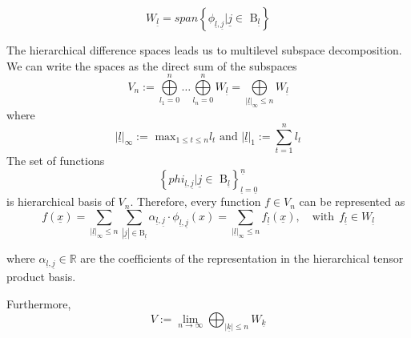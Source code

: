 \begin{equation}
     W_{\underline{l}} = span\left\{\phi_{\underline{l},\underline{j}} | \underline{j} \in \text{ B}_{\underline{l}}\right\}
\end{equation}

The hierarchical difference spaces leads us to multilevel subspace decomposition. We can write the spaces as the direct sum of the subspaces
\begin{equation}
     V_{n} := \bigoplus\limits_{l_{1} = 0}^n \dots \bigoplus\limits_{l_{n} = 0}^n W_{\underline{l}} = \bigoplus\limits_{\left|\underline{l} \right|_{\infty} \leq n} W_{\underline{l}}
     \label{eq9}
\end{equation}
where
\begin{equation}
     \left|\underline{l} \right|_{\infty} := \text{ max}_{1 \leq t \leq n} l_{t} \text{ and } \left|\underline{l} \right|_{1} := \sum\limits_{t=1}^{n} l_{t}
\end{equation}
The set of functions
\begin{equation}
     \left\{phi_{\underline{l},\underline{j}} | \underline{j} \in \text{ B}_{\underline{l}} \right\}_{\underline{l} = \underline{0}}^{\underline{n}}
\end{equation}
is hierarchical basis of $V_{n}$. Therefore, every function $f \in V_{n}$ can be represented as
\begin{equation}
	f(\underline{x}) = \sum_{|\underline{l}|_\infty\le n} \sum_{|\underline{j}| \in \text{B}_{\underline{l}}} \alpha_{\underline{l},\underline{j}} \cdot \phi_{\underline{l},\underline{j}} (x) = \sum_{|\underline{l}|_\infty\le n} f_{\underline{l}}(\underline{x}), \quad \text{with} \ \ f_{\underline{l}} \in W_{\underline{l}}
\end{equation}

where $\alpha_{\underline{l},\underline{j}} \in \mathbb{R} $
are the coefficients of the representation in the hierarchical tensor product basis. 

Furthermore,
\begin{equation}
    V := \lim\limits_{n\rightarrow\infty} \bigoplus_{|\underline{k}|\le n} W_{\underline{k}}
\end{equation}

